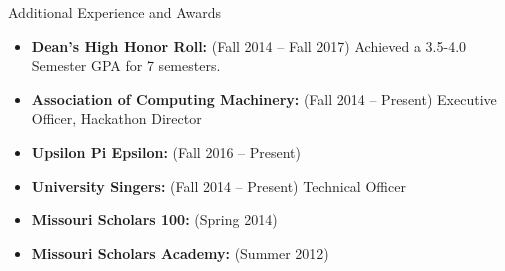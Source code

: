 \documentclass[]{mcdowellcv}
\begin{document}
    \begin{cvsection}{Additional Experience and Awards}
        \begin{cvsubsection}{}{}{}	
            \begin{itemize}
                \item \textbf{Dean's High Honor Roll:}  (Fall 2014 -- Fall 2017) Achieved a 3.5-4.0 Semester GPA for 7 semesters.
                \item \textbf{Association of Computing Machinery:} (Fall 2014 -- Present) Executive Officer, Hackathon Director
                \item \textbf{Upsilon Pi Epsilon:}  (Fall 2016 -- Present)
                \item \textbf{University Singers:} (Fall 2014 -- Present) Technical Officer
                \item \textbf{Missouri Scholars 100:} (Spring 2014)
                \item \textbf{Missouri Scholars Academy:} (Summer 2012)
            \end{itemize}
        \end{cvsubsection}
    \end{cvsection}
\end{document}
